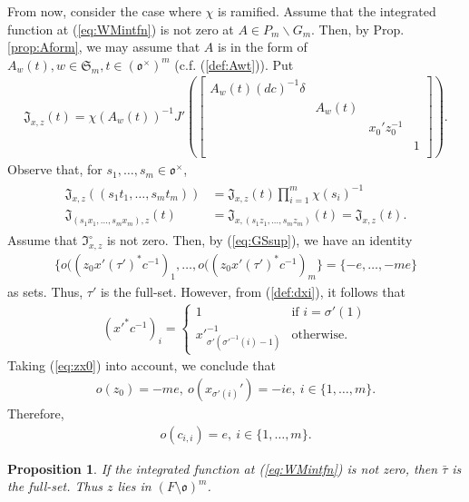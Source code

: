 \documentclass[11pt]{amsart}
\newcommand\s{\sigma}%
\newcommand\oo{\mathfrak{o}}
\newcommand\Sf{{\mathfrak{S}}}
\newcommand\If{\mathfrak{I}}
\newcommand\Jf{\mathfrak{J}}
\newcommand\1{\mathbf{1}}
\newcommand\bs{\backslash}%
\newcommand\tm{\times}
\numberwithin{equation}{section}
\newtheorem{prop}[thm]{Proposition}
\begin{document}
From now, consider the case where $\chi$ is ramified.
Assume that the integrated function at (\ref{eq:WMintfn}) is not zero at $A \in P_m \bs G_m$.
Then, by Prop. \ref{prop:Aform}, we may assume that $A$ is in the form of $A_w(t),w \in \Sf_m, t \in (\oo^\tm)^m$ (c.f. (\ref{def:Awt})).
Put
\begin{align*}
\Jf_{x,z}(t) = \chi(A_w(t))^{-1} J'(\begin{bmatrix}
A_w(t) (dc)^{-1}\delta & & &  \\
& A_w(t) &   & \\
& &x_0' z_{0}^{-1} &  \\
& & &1  \\
\end{bmatrix}).
\end{align*} 
Observe that, for $s_1, \ldots, s_m \in \oo^\tm$, 
\begin{align}
\begin{split}
\Jf_{x,z}((s_1t_1, \ldots, s_m t_m)) &= \Jf_{x,z}(t) \prod_{i = 1}^m \chi(s_i)^{-1} \\
 \Jf_{(s_1x_1, \ldots, s_m x_m),z}(t) &= \Jf_{x, (s_1z_1, \ldots, s_m z_m)}(t) = \Jf_{x,z}(t).
  \end{split}
\label{eq:Jfxz}
\end{align}
Assume that $\If_{x,z}^\circ$ is not zero.
Then, by (\ref{eq:GSsup}), we have an identity
\begin{align*}
\{o((z_0 x'(\tau')^*c^{-1})_1, \ldots,o((z_0 x'(\tau')^*c^{-1})_m \} = \{ -e, \ldots, -me \}
\end{align*} 
as sets.
Thus, $\tau'$ is the full-set.
However, from (\ref{def:dxi}), it follows that 
\begin{align*}
(x'^*c^{-1})_i = 
\begin{cases}
1 & \mbox{if $i = \s'(1)$} \\
x'^{-1}_{\s'(\s'^{-1}(i) -1)} & \mbox{otherwise}. 
\end{cases}
\end{align*}
Taking (\ref{eq:zx0}) into account, we conclude that 
\begin{align*}
o(z_0) = -me, \ o(x_{\s'(i)}') = - ie, \ i \in \{1,\ldots, m \}.
\end{align*} 
Therefore,
\begin{align*}
o(c_{i,i}) = e, \ i \in \{1,\ldots, m \}.
\end{align*}
\begin{prop}
If the integrated function at (\ref{eq:WMintfn}) is not zero, then $\bar{\tau}$ is the full-set.
Thus $z$ lies in $(F \setminus \oo)^m$.
\end{prop}
\end{document}
